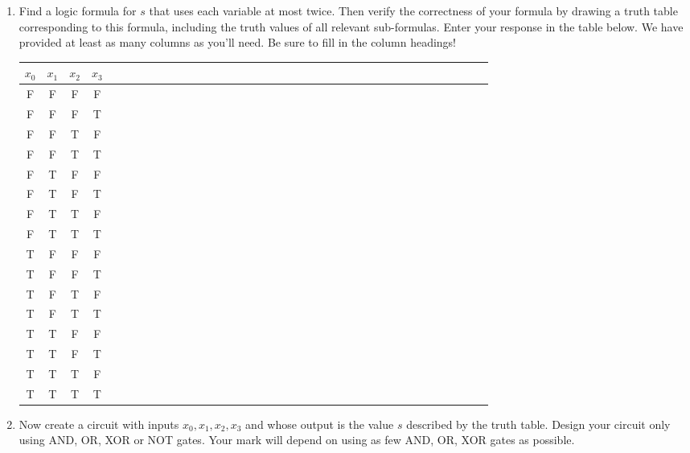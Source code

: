 \begin{enumerate}
\item Find a logic formula for $s$ that uses each variable at most twice. Then verify the correctness of your formula by drawing a truth table corresponding to this formula, including the truth values of all relevant sub-formulas. Enter your response in the table below. We have provided at least as many columns as you'll need. Be sure to fill in the column headings!

\LARGE
\begin{tabular}{|c|c|c|c||c|c|c|c|c|}
\hline
$x_0$ & $x_1$ & $x_2$ & $x_3$ & ~~~~~~~~~~ & ~~~~~~~~~~ & ~~~~~~~~~~ & ~~~~~~~~~~ & ~~~~~~~~~~\\
\hline
\hline
F & F & F & F & & & & &\\
\hline
F & F & F & T & & & & &\\
\hline
F & F & T & F & & & & &\\
\hline
F & F & T & T & & & & &\\
\hline
F & T & F & F & & & & &\\
\hline
F & T & F & T & & & & &\\
\hline
F & T & T & F & & & & &\\
\hline
F & T & T & T & & & & &\\
\hline
T & F & F & F & & & & &\\
\hline
T & F & F & T & & & & &\\
\hline
T & F & T & F & & & & &\\
\hline
T & F & T & T & & & & &\\
\hline
T & T & F & F & & & & &\\
\hline
T & T & F & T & & & & &\\
\hline
T & T & T & F & & & & &\\
\hline
T & T & T & T & & & & &\\
\hline
\end{tabular}
\large

\item Now  create a circuit with inputs $x_0,x_1,x_2,x_3$ and whose output is the value $s$ described by the truth table. Design your circuit only using AND, OR, XOR or NOT gates. Your mark will depend on using as few  AND, OR, XOR gates as possible.  


\end{enumerate}
